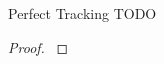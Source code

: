\begin{theorem}{Perfect Tracking TODO}
\label{thm:perfect-tracking-todo}

\end{theorem}

\begin{proof}
\label{prf:perfect-tracking-todo}

\end{proof}

